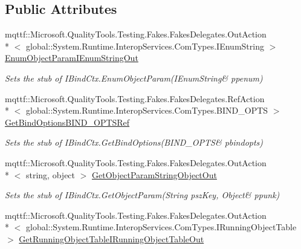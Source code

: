 \subsection*{Public Attributes}
\begin{DoxyCompactItemize}
\item 
mqttf\-::\-Microsoft.\-Quality\-Tools.\-Testing.\-Fakes.\-Fakes\-Delegates.\-Out\-Action\\*
$<$ global\-::\-System.\-Runtime.\-Interop\-Services.\-Com\-Types.\-I\-Enum\-String $>$ \hyperlink{class_system_1_1_runtime_1_1_interop_services_1_1_com_types_1_1_fakes_1_1_stub_i_bind_ctx_a8bf81b47b5bd1a01d7f47364fe6bcb4e}{Enum\-Object\-Param\-I\-Enum\-String\-Out}
\begin{DoxyCompactList}\small\item\em Sets the stub of I\-Bind\-Ctx.\-Enum\-Object\-Param(I\-Enum\-String\& ppenum)\end{DoxyCompactList}\item 
mqttf\-::\-Microsoft.\-Quality\-Tools.\-Testing.\-Fakes.\-Fakes\-Delegates.\-Ref\-Action\\*
$<$ global\-::\-System.\-Runtime.\-Interop\-Services.\-Com\-Types.\-B\-I\-N\-D\-\_\-\-O\-P\-T\-S $>$ \hyperlink{class_system_1_1_runtime_1_1_interop_services_1_1_com_types_1_1_fakes_1_1_stub_i_bind_ctx_ac0ff0252b1947b14537fa5c77972a337}{Get\-Bind\-Options\-B\-I\-N\-D\-\_\-\-O\-P\-T\-S\-Ref}
\begin{DoxyCompactList}\small\item\em Sets the stub of I\-Bind\-Ctx.\-Get\-Bind\-Options(B\-I\-N\-D\-\_\-\-O\-P\-T\-S\& pbindopts)\end{DoxyCompactList}\item 
mqttf\-::\-Microsoft.\-Quality\-Tools.\-Testing.\-Fakes.\-Fakes\-Delegates.\-Out\-Action\\*
$<$ string, object $>$ \hyperlink{class_system_1_1_runtime_1_1_interop_services_1_1_com_types_1_1_fakes_1_1_stub_i_bind_ctx_afd5531a312a0134c8b5a9d6a84761df0}{Get\-Object\-Param\-String\-Object\-Out}
\begin{DoxyCompactList}\small\item\em Sets the stub of I\-Bind\-Ctx.\-Get\-Object\-Param(String psz\-Key, Object\& ppunk)\end{DoxyCompactList}\item 
mqttf\-::\-Microsoft.\-Quality\-Tools.\-Testing.\-Fakes.\-Fakes\-Delegates.\-Out\-Action\\*
$<$ global\-::\-System.\-Runtime.\-Interop\-Services.\-Com\-Types.\-I\-Running\-Object\-Table $>$ \hyperlink{class_system_1_1_runtime_1_1_interop_services_1_1_com_types_1_1_fakes_1_1_stub_i_bind_ctx_a1f492c84f3c693ace3275e0c69df2ebc}{Get\-Running\-Object\-Table\-I\-Running\-Object\-Table\-Out}

\end{DoxyCompactItemize}
